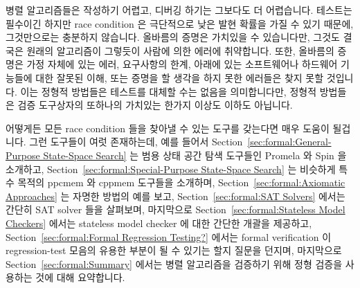 
%


병렬 알고리즘들은 작성하기 어렵고, 디버깅 하기는 그보다도 더 어렵습니다.
테스트는 필수이긴 하지만 race condition 은 극단적으로 낮은 발현 확률을 가질 수
있기 때문에, 그것만으로는 충분하지 않습니다.
올바름의 증명은 가치있을 수 있습니다만, 그것도 결국은 원래의 알고리즘이
그렇듯이 사람에 의한 에러에 취약합니다.
또한, 올바름의 증명은 가정 자체에 있는 에러, 요구사항의 한계, 아래에 있는
소프트웨어나 하드웨어 기능들에 대한 잘못된 이해, 또는 증명을 할 생각을 하지
못한 에러들은 찾지 못할 것입니다.
이는 정형적 방법들은 테스트를 대체할 수는 없음을 의미합니다만, 정형적 방법들은
검증 도구상자의 또하나의 가치있는 한가지 이상도 이하도 아닙니다.
\iffalse

Parallel algorithms can be hard to write, and even harder to debug.
Testing, though essential, is insufficient, as fatal race conditions
can have extremely low probabilities of occurrence.
Proofs of correctness can be valuable, but in the end are just as
prone to human error as is the original algorithm.
In addition, a proof of correctness cannot be expected to find errors
in your assumptions, shortcomings in the requirements,
misunderstandings of the underlying software or hardware primitives,
or errors that you did not think to construct a proof for.
This means that formal methods can never replace testing, however,
formal methods are nevertheless a valuable addition to your validation toolbox.
\fi

어떻게든 모든 race condition 들을 찾아낼 수 있는 도구를 갖는다면 매우 도움이
될겁니다.
그런 도구들이 여럿 존재하는데, 예를 들어서
Section~\ref{sec:formal:General-Purpose State-Space Search}
는 범용 상태 공간 탐색 도구들인 Promela 와 Spin 을 소개하고,
Section~\ref{sec:formal:Special-Purpose State-Space Search}
는 비슷하게 특수 목적의 ppcmem 와 cppmem 도구들을 소개하며,
Section~\ref{sec:formal:Axiomatic Approaches}
는 자명한 방법의 예를 보고,
Section~\ref{sec:formal:SAT Solvers}
에서는 간단히 SAT solver 들을 살펴보며, 마지막으로
Section~\ref{sec:formal:Stateless Model Checkers}
에서는 stateless model checker 에 대한 간단한 개괄을 제공하고,
Section~\ref{sec:formal:Formal Regression Testing?}
에서는 formal verification 이 regression-test 모음의 유용한 부분이 될 수 있기는
할지 질문을 던지며, 마지막으로
Section~\ref{sec:formal:Summary}
에서는 병렬 알고리즘을 검증하기 위해 정형 검증을 사용하는 것에 대해 요약합니다.
\iffalse

